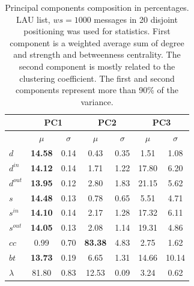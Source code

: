 \documentclass[%
 aip,
 jmp,%
 amsmath,amssymb,
 reprint,%
]{revtex4-1}
\begin{document}
\begin{table}
  \centering
  \caption{Principal components composition in percentages. LAU list, $ws=1000$ messages in 20 disjoint positioning was used for statistics. First component is a weighted average sum of degree and strength and betweenness centrality. The second component is mostly related to the  clustering coefficient. The first and second components represent more than 90\% of the variance.}
  \begin{tabular}{|l|c|c| c|c| c|c|}\hline
 & \multicolumn{2}{c|}{PC1} & \multicolumn{2}{c|}{PC2} & \multicolumn{2}{c|}{PC3}  \\\hline
       & $\mu$ & $\sigma$ & $\mu$ & $\sigma$ & $\mu$ & $\sigma$  \\\hline
$d$       & {\bf 14.58} & 0.14 & 0.43  & 0.35 & 1.51  & 1.08 \\
$d^{in}$  & {\bf 14.12} & 0.14 & 1.71  & 1.22 & 17.80 & 6.20 \\
$d^{out}$ & {\bf 13.95} & 0.12 & 2.80  & 1.83 & 21.15 & 5.62 \\
$s$       & {\bf 14.48} & 0.13 & 0.78  & 0.65 & 5.51  & 4.71 \\ 
$s^{in}$  & {\bf 14.10} & 0.14 & 2.17  & 1.28 & 17.32 & 6.11 \\ 
$s^{out}$ & {\bf 14.05} & 0.13 & 2.08  & 1.14 & 19.31 & 4.86 \\ \hline
$cc$      & 0.99        & 0.70 & {\bf 83.38} & 4.83 & 2.75  & 1.62 \\ 
$bt$      & {\bf 13.73} & 0.19 & 6.65  & 1.31 & 14.66 & 10.14 \\ \hline
$\lambda$ & 81.80 & 0.83 & 12.53 & 0.09  & 3.24 & 0.62 \\ \hline
  \end{tabular}
  \label{compPCA}
\end{table}
\end{document}
